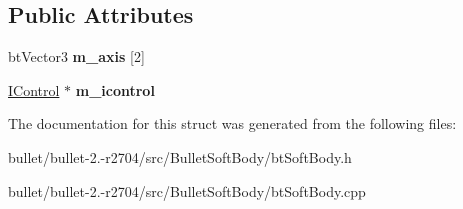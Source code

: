 \subsection*{Public Attributes}
\begin{DoxyCompactItemize}
\item 
\hypertarget{structbt_soft_body_1_1_a_joint_a045c37b97d087308684d248b7d1ca51e}{bt\+Vector3 {\bfseries m\+\_\+axis} \mbox{[}2\mbox{]}}\label{structbt_soft_body_1_1_a_joint_a045c37b97d087308684d248b7d1ca51e}

\item 
\hypertarget{structbt_soft_body_1_1_a_joint_a9caf65d5ea6cfa0a85a31b8f96865526}{\hyperlink{structbt_soft_body_1_1_a_joint_1_1_i_control}{I\+Control} $\ast$ {\bfseries m\+\_\+icontrol}}\label{structbt_soft_body_1_1_a_joint_a9caf65d5ea6cfa0a85a31b8f96865526}

\end{DoxyCompactItemize}


The documentation for this struct was generated from the following files\+:\begin{DoxyCompactItemize}
\item 
bullet/bullet-\/2.-\/r2704/src/\+Bullet\+Soft\+Body/bt\+Soft\+Body.\+h\item 
bullet/bullet-\/2.-\/r2704/src/\+Bullet\+Soft\+Body/bt\+Soft\+Body.\+cpp\end{DoxyCompactItemize}
